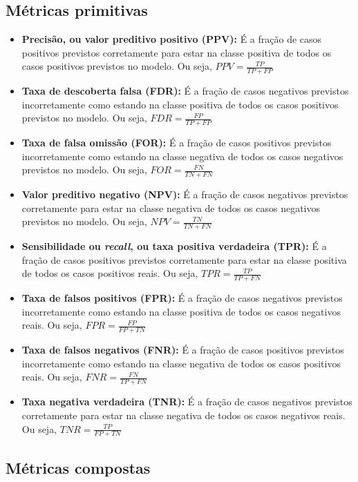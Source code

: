 \documentclass[portugues, 12pt, a4paper]{article}
\begin{document}
\subsection{Métricas primitivas}

\begin{itemize}
\item \textbf{Precisão, ou valor preditivo positivo (PPV):} É a fração de casos positivos previstos corretamente para estar na classe positiva de todos os casos positivos previstos no modelo. Ou seja, $PPV = \frac{TP}{TP + FP}$
\item \textbf{Taxa de descoberta falsa (FDR):} É a fração de casos negativos previstos incorretamente como estando na classe positiva de todos os casos positivos previstos no modelo. Ou seja, $FDR  = \frac{FP}{TP + FP}$
\item \textbf{Taxa de falsa omissão (FOR):} É a fração de casos positivos previstos incorretamente como estando na classe negativa de todos os casos negativos previstos no modelo. Ou seja, $FOR = \frac{FN}{TN + FN}$
\item \textbf{Valor preditivo negativo (NPV):} É a fração de casos negativos previstos corretamente para estar na classe negativa de todos os casos negativos previstos no modelo. Ou seja, $NPV = \frac{TN}{TN + FN}$
\item \textbf{Sensibilidade ou \textit{recall}, ou taxa positiva verdadeira (TPR):} É a fração de casos positivos previstos corretamente para estar na classe positiva de todos os casos positivos reais. Ou seja, $TPR = \frac{TP}{TP + FN}$
\item \textbf{Taxa de falsos positivos (FPR):} É a fração de casos negativos previstos incorretamente como estando na classe positiva de todos os casos negativos reais. Ou seja, $FPR = \frac{FP}{FP + TN}$
\item \textbf{Taxa de falsos negativos (FNR):} É a fração de casos positivos previstos incorretamente como estando na classe negativa de todos os casos positivos reais. Ou seja, $FNR = \frac{FN}{TP + FN}$
\item \textbf{Taxa negativa verdadeira (TNR):} É a fração de casos negativos previstos corretamente para estar na classe negativa de todos os casos negativos reais. Ou seja, $TNR = \frac{TP}{FP + TN}$
\end{itemize}

\subsection{Métricas compostas}
\end{document}
